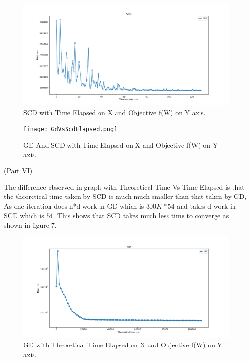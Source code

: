 \documentclass[a4paper,11pt]{article}
\begin{document}
\begin{mlsolution}
\begin{figure}[th]%
\centering
\includegraphics[width=1.2\columnwidth]{SCD-elapsed.png}%

\caption{SCD with Time Elapsed on X and Objective f(W) on Y axis.}%
\label{fig:SCD1}%
\end{figure}

\begin{figure}[th]%
\centering
\texttt{[image: GdVsScdElapsed.png]}%

\caption{GD And SCD with Time Elapsed on X and Objective f(W) on Y axis.}%
\label{fig:GD3}%
\end{figure}


\newpage
(Part VI)

The difference observed in graph with Theoretical Time Vs Time Elapsed is that the theoretical time taken by SCD is much much smaller than that taken by GD, As one iteration does n*d work in GD which is $300K * 54$ and takes d work in SCD which is $54$. This shows that SCD takes much less time to converge as shown in figure 7.

\begin{figure}[th]%
\centering
\includegraphics[width=1.2\columnwidth]{GD-theo.png}%

\caption{GD with Theoretical Time Elapsed on X and Objective f(W) on Y axis.}%
\label{fig:GD2}%
\end{figure}


\end{mlsolution}
\end{document}
